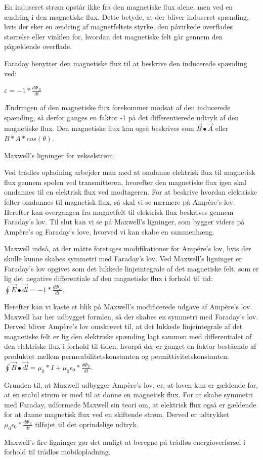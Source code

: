 En induseret strøm opstår ikke fra den magnetiske flux alene, men ved en ændring i den magnetiske flux. Dette betyde, at der bliver induseret spænding, hvis der sker en ændring af magnetfeltets styrke, den påvirkede overflades størrelse eller vinklen for, hvordan det magnetiske felt går gennem den pågældende overflade.

Faraday benytter den magnetiske flux til at beskrive den inducerede spænding ved:

\centerline{$\varepsilon = -1 * \frac{d \Phi_B}{dt}$}

Ændringen af den magnetiske flux forekommer modsat af den inducerede spænding, så derfor ganges en faktor -1 på det differentierede udtryk af den magnetiske flux. Den magnetiske flux kan også beskrives som $\vec{B} \bullet \vec{A}$ eller $B * A * cos(\theta)$.

Maxwell's ligninger for vekselstrøm:

Ved trådløs opladning arbejder man med at omdanne elektrisk flux til magnetisk flux gennem spolen ved transmitteren, hvorefter den magnetiske flux igen skal omdannes til en elektrisk flux ved modtageren. For at beskrive hvordan elektriske felter omdannes til magnetisk flux, så skal vi se nærmere på Ampére's lov. Herefter kan overgangen fra magnetfelt til elektrisk flux beskrives gennem Faraday's lov. Til slut kan vi se på Maxwell's ligninger, som bygger videre på Ampère's og Faraday's love, hvorved vi kan skabe en sammenhæng.

Maxwell indså, at der måtte foretages modifikationer for Ampére's lov, hvis der skulle kunne skabes symmetri med Faraday's lov. Ved Maxwell's ligninger er Faraday's lov opgivet som det lukkede linjeintegrale af det magnetiske felt, som er lig det negative differentiale af den magnetiske flux i forhold til tid: $\oint \vec{E} \bullet \vec{dl} = -1 * \frac{d \Phi_B}{dt}$.

Herefter kan vi kaste et blik på Maxwell's modificerede udgave af Ampère's lov. Maxwell har her udbygget formlen, så der skabes en symmetri med Faraday's lov. Derved bliver Ampère's lov omskrevet til, at det lukkede linjeintegrale af det magnetiske felt er lig den elektriske spænding lagt sammen med differentialet af den elektriske flux i forhold til tiden, hvorpå der er ganget en faktor bestående af produktet mellem permeabilitetskonstanten og permittivitetskonstanten: $\oint \vec{B} \bullet \vec{dl} = \mu_0 * I + \mu_0 \epsilon_0 * \frac{d \Phi_E}{dt}$.

Grunden til, at Maxwell udbygger Ampère's lov, er, at loven kun er gældende for, at en stabil strøm er med til at danne en magnetisk flux. For at skabe symmetri med Faraday, udformede Maxwell sin teori om, at elektrisk flux også er gældende for at danne magnetisk flux ved en skiftende strøm. Derved er udtrykket $\mu_0 \epsilon_0 * \frac{d \Phi_E}{dt}$ tilføjet til det oprindelige udtryk.

Maxwell's fire ligninger gør det muligt at beregne på trådløs energioverførsel i forhold til trådløs mobilopladning.